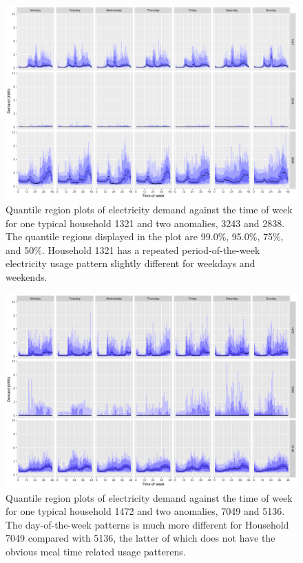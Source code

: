 \documentclass[11pt,a4paper,]{article}
\begin{document}
\begin{figure}

{\centering \includegraphics[width=0.9\linewidth]{figures/hdr_electricity_hdrbox_3id_7dow} 

}

\caption{Quantile region plots of electricity demand against the time of week for one typical household 1321 and two anomalies, 3243 and 2838. The quantile regions displayed in the plot are 99.0\%, 95.0\%, 75\%, and 50\%. Household 1321 has a repeated period-of-the-week electricity usage pattern slightly different for weekdays and weekends.}\label{fig:electricityhdrsfixed}
\end{figure}

\begin{figure}

{\centering \includegraphics[width=0.9\linewidth]{figures/electricity_hdrbox_3id_7dow} 

}

\caption{Quantile region plots of electricity demand against the time of week for one typical household 1472 and two anomalies, 7049 and 5136. The day-of-the-week patterns is much more different for Household 7049 compared with 5136, the latter of which does not have the obvious meal time related usage patterens.}\label{fig:electricityhdrsvkde}
\end{figure}
\end{document}
